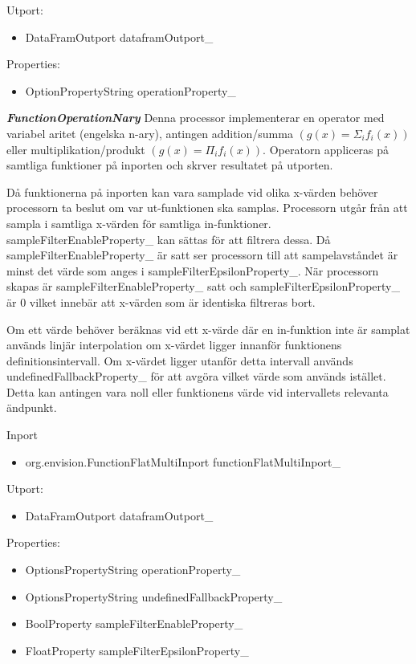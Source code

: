 \documentclass[a4paper,12pt]{article}
\begin{document}
Utport:
\begin{itemize}
\item DataFramOutport dataframOutport\_
\end{itemize}

Properties:
\begin{itemize}
\item OptionPropertyString operationProperty\_
\end{itemize}

\textbf{\textit{FunctionOperationNary}}\newline
Denna processor implementerar en operator med variabel aritet (engelska n-ary), antingen addition/summa $(g(x) = \Sigma_{i}f_{i}(x))$ eller multiplikation/produkt $(g(x) = \Pi_{i}f_{i}(x))$. Operatorn appliceras på samtliga funktioner på inporten och skrver resultatet på utporten.

Då funktionerna på inporten kan vara samplade vid olika x-värden behöver processorn ta beslut om var ut-funktionen ska samplas. Processorn utgår från att sampla i samtliga x-värden för samtliga in-funktioner. sampleFilterEnableProperty\_ kan sättas för att filtrera dessa. Då sampleFilterEnableProperty\_ är satt ser processorn till att sampelavståndet är minst det värde som anges i sampleFilterEpsilonProperty\_. När processorn skapas är sampleFilterEnableProperty\_ satt och sampleFilterEpsilonProperty\_ är 0 vilket innebär att x-värden som är identiska filtreras bort.

Om ett värde behöver beräknas vid ett x-värde där en in-funktion inte är samplat används linjär interpolation om x-värdet ligger innanför funktionens definitionsintervall. Om x-värdet ligger utanför detta intervall används undefinedFallbackProperty\_ för att avgöra vilket värde som används istället. Detta kan antingen vara noll eller funktionens värde vid intervallets relevanta ändpunkt.

Inport
\begin{itemize}
\item org.envision.FunctionFlatMultiInport functionFlatMultiInport\_ 
\end{itemize}

Utport:
\begin{itemize}
\item DataFramOutport dataframOutport\_
\end{itemize}

Properties:
\begin{itemize}
\item OptionsPropertyString operationProperty\_
\item OptionsPropertyString undefinedFallbackProperty\_
\item BoolProperty sampleFilterEnableProperty\_
\item FloatProperty sampleFilterEpsilonProperty\_
\end{itemize}
\end{document}

